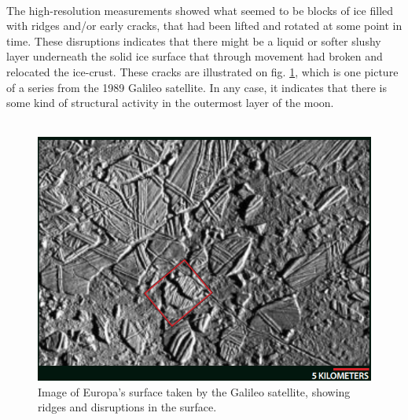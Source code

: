 \fi
\\
The high-resolution measurements showed what seemed to be blocks of ice filled with ridges and/or early cracks, that had been lifted and rotated at some point in time. These disruptions indicates that there might be a liquid or softer slushy layer underneath the solid ice surface that through movement had broken and relocated the ice-crust. These cracks are illustrated on fig. \ref{fig:SurfCrack}, which is one picture of a series from the 1989 Galileo satellite\cite{HidOcean}. In any case, it indicates that there is some kind of structural activity in the outermost layer of the moon.\\
\\

\begin{figure}[htb]
	\centering
	\includegraphics[width=\textwidth]{figures/Rasmus/SurfCrack}
	\caption{Image of Europa's surface taken by the Galileo satellite, showing ridges and disruptions in the surface. \label{fig:SurfCrack}\cite{HidOcean}}
\end{figure}

